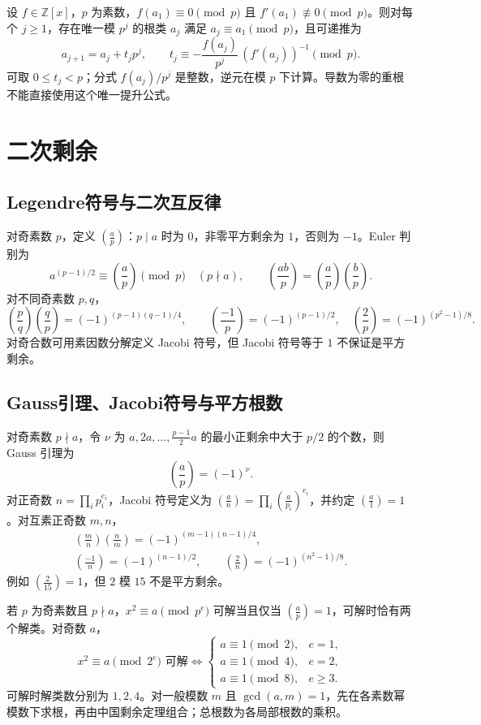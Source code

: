 \documentclass[../main.tex]{subfiles}
\begin{document}
设 $f\in\mathbb Z[x]$，$p$ 为素数，$f(a_1)\equiv0\pmod p$ 且 $f'(a_1)\not\equiv0\pmod p$。则对每个 $j\ge1$，存在唯一模 $p^j$ 的根类 $a_j$ 满足 $a_j\equiv a_1\pmod p$，且可递推为
\[
a_{j+1}=a_j+t_jp^j,\qquad
t_j\equiv-\frac{f(a_j)}{p^j}\,(f'(a_j))^{-1}\pmod p.
\]
可取 $0\le t_j<p$；分式 $f(a_j)/p^j$ 是整数，逆元在模 $p$ 下计算。导数为零的重根不能直接使用这个唯一提升公式。

\section{二次剩余}
\subsection{Legendre符号与二次互反律}
对奇素数 $p$，定义 $\left(\frac ap\right)$：$p\mid a$ 时为 $0$，非零平方剩余为 $1$，否则为 $-1$。Euler 判别为
\[
a^{(p-1)/2}\equiv\left(\frac ap\right)\pmod p\quad(p\nmid a),\qquad
\left(\frac{ab}p\right)=\left(\frac ap\right)\left(\frac bp\right).
\]
对不同奇素数 $p,q$，
\[
\left(\frac pq\right)\left(\frac qp\right)=(-1)^{(p-1)(q-1)/4},\qquad
\left(\frac{-1}p\right)=(-1)^{(p-1)/2},\quad
\left(\frac2p\right)=(-1)^{(p^2-1)/8}.
\]
对奇合数可用素因数分解定义 Jacobi 符号，但 Jacobi 符号等于 $1$ 不保证是平方剩余。
\subsection{Gauss引理、Jacobi符号与平方根数}
对奇素数 $p\nmid a$，令 $\nu$ 为 $a,2a,\ldots,\frac{p-1}{2}a$ 的最小正剩余中大于 $p/2$ 的个数，则 Gauss 引理为
\[
\left(\frac ap\right)=(-1)^\nu.
\]
对正奇数 $n=\prod_i p_i^{e_i}$，Jacobi 符号定义为 $\left(\frac an\right)=\prod_i\left(\frac a{p_i}\right)^{e_i}$，并约定 $\left(\frac a1\right)=1$。对互素正奇数 $m,n$，
\begin{gather*}
\left(\frac mn\right)\left(\frac nm\right)=(-1)^{(m-1)(n-1)/4},\\
\left(\frac{-1}n\right)=(-1)^{(n-1)/2},\qquad
\left(\frac2n\right)=(-1)^{(n^2-1)/8}.
\end{gather*}
例如 $\left(\frac2{15}\right)=1$，但 $2$ 模 $15$ 不是平方剩余。

若 $p$ 为奇素数且 $p\nmid a$，$x^2\equiv a\pmod{p^e}$ 可解当且仅当 $\left(\frac ap\right)=1$，可解时恰有两个解类。对奇数 $a$，
\[
x^2\equiv a\pmod{2^e}\text{ 可解}\iff
\begin{cases}
a\equiv1\pmod2,&e=1,\\
a\equiv1\pmod4,&e=2,\\
a\equiv1\pmod8,&e\ge3.
\end{cases}
\]
可解时解类数分别为 $1,2,4$。对一般模数 $m$ 且 $\gcd(a,m)=1$，先在各素数幂模数下求根，再由中国剩余定理组合；总根数为各局部根数的乘积。
\end{document}

